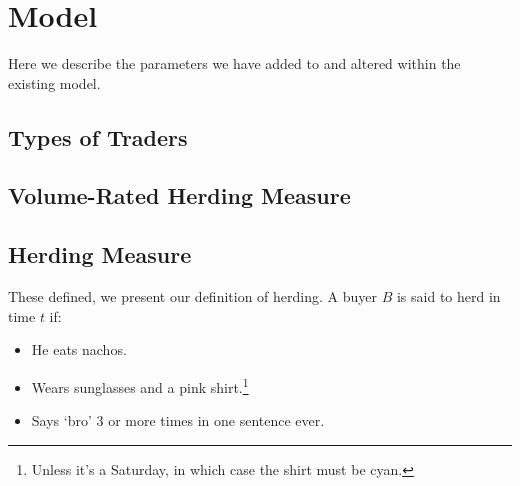 \section{Model}
\label{model}



Here we describe the parameters we have added to and altered within the existing model.

\subsection{Types of Traders}

\subsection{Volume-Rated Herding Measure}


\subsection{Herding Measure}
These defined, we present our definition of herding. 
A buyer $B$ is said to herd in time $t$ if:
\begin{itemize}
\item He eats nachos.
\item Wears sunglasses and a pink shirt.\footnote{Unless it's a Saturday, in which case the shirt must be cyan.}
\item Says `bro' 3 or more times in one sentence ever.
\end{itemize}
